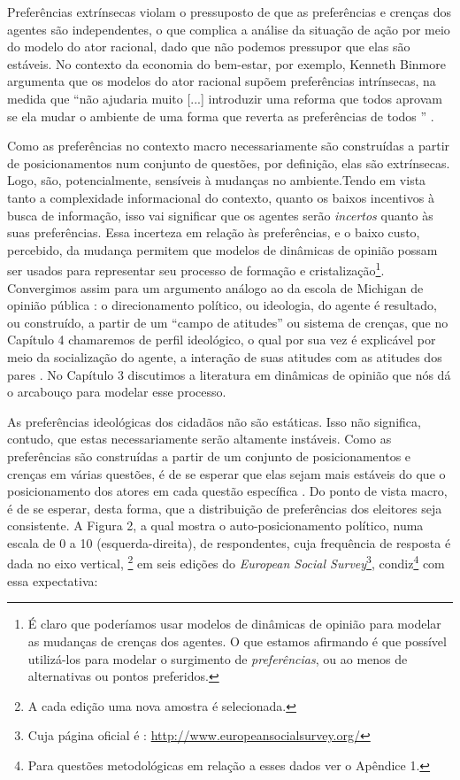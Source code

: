 Preferências extrínsecas violam o pressuposto de que as preferências e crenças
dos agentes são independentes, o que complica a análise da situação de ação por
meio do modelo do ator racional, dado que não podemos pressupor que elas são
estáveis. No contexto da economia do bem-estar, por exemplo,
Kenneth Binmore argumenta que os modelos do ator racional supõem
preferências intrínsecas, na medida que ``não ajudaria muito [...] introduzir uma
reforma que todos aprovam se ela mudar o ambiente de uma forma que reverta as
preferências de todos '' \cite[p.6]{binmore2008rational}.

Como as preferências no contexto macro necessariamente são construídas a partir
de posicionamentos num conjunto de questões, por definição, elas são
extrínsecas. Logo, são, potencialmente, sensíveis à mudanças no ambiente.Tendo
em vista tanto a complexidade informacional do contexto, quanto os baixos
incentivos à busca de informação, isso vai significar que os agentes serão
\textit{incertos} quanto às suas preferências. Essa incerteza em relação às
preferências, e o baixo custo, percebido, da mudança permitem que modelos de
dinâmicas de opinião possam ser usados para representar seu processo de formação
e cristalização\footnote{É claro que poderíamos usar modelos de dinâmicas de
  opinião para modelar as mudanças de crenças dos agentes. O que estamos
  afirmando é que possível utilizá-los para modelar o surgimento de
  \textit{preferências}, ou ao menos de alternativas ou pontos preferidos.}.
Convergimos assim para um argumento análogo ao da escola de Michigan de opinião
pública : o direcionamento político, ou ideologia, do agente é resultado, ou
construído, a partir de um ``campo de atitudes'' ou sistema de crenças, que no
Capítulo 4 chamaremos de perfil ideológico, o qual por sua vez é explicável por
meio da socialização do agente, a interação de suas atitudes com as atitudes dos
pares \cite{figueiredo2008decisao}. No Capítulo 3 discutimos a literatura em
dinâmicas de opinião que nós dá o arcabouço para modelar esse processo.

As preferências ideológicas dos cidadãos não são estáticas. Isso não significa,
contudo, que estas necessariamente serão altamente instáveis. Como as
preferências são construídas a partir de um conjunto de posicionamentos e
crenças em várias questões, é de se esperar que elas sejam mais estáveis do que
o posicionamento dos atores em cada questão específica
\cite{druckman2012public}. Do ponto de vista macro, é de se esperar, desta
forma, que a distribuição de preferências dos eleitores seja consistente. A
Figura 2, a qual mostra o auto-posicionamento político, numa escala de 0 a 10
(esquerda-direita), de respondentes, cuja frequência de resposta é dada no eixo
vertical, \footnote{A cada edição uma nova amostra é selecionada.} em seis
edições do \textit{European Social Survey}\footnote{Cuja página oficial é :
  \url{http://www.europeansocialsurvey.org/}}, condiz\footnote{Para questões
  metodológicas em relação a esses dados ver o Apêndice 1.} com essa
expectativa:

